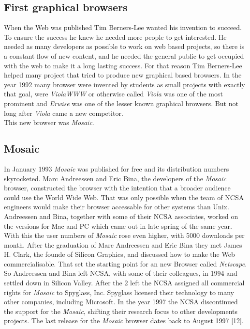 \documentclass[runningheads]{llncs}
\begin{document}
		\subsection{First graphical browsers}
		When the Web was published Tim Berners-Lee wanted his invention to succeed. To ensure the success he knew he needed more people to get interested. He needed as many developers as possible to work on web based projects, so there is a constant flow of new content, and he needed the general public to get occupied with the web to make it a long lasting success. For that reason Tim Berners-Lee helped many project that tried to produce new graphical based browsers. In the year 1992 many browser were invented by students as small projects with exactly that goal, were \textit{ViolaWWW} or otherwise called \textit{Viola} was one of the most prominent and \textit{Erwise} was one of the lesser known graphical browsers. But not long after \textit{Viola} came a new competitor. \\This new browser was \textit{Mosaic}.
		\subsection{Mosaic}
		In January 1993 \textit{Mosaic} was published for free and its distribution numbers skyrocketed. Marc Andreessen and Eric Bina, the developers of the \textit{Mosaic} browser, constructed the browser with the intention that a broader audience could use the World Wide Web. That was only possible when the team of NCSA engineers would make their browser accessable for other systems than Unix. Andreessen and Bina, together with some of their NCSA associates, worked on the versions for Mac and PC which came out in late spring of the same year. With this the user numbers of \textit{Mosaic} rose even higher, with 5000 downloads per month. After the graduation of Marc Andreessen and Eric Bina they met James H. Clark, the founde of Silicon Graphics, and discussed how to make the Web commercialisable. That set the starting point for an new Browser called \textit{Netscape}. So Andreessen and Bina left NCSA, with some of their colleagues, in 1994 and settled down in Silicon Valley. After the 2 left the NCSA assigned all commercial rights for \textit{Mosaic} to Spyglass, Inc. Spyglass licensed their technology to many other companies, including Microsoft. In the year 1997 the NCSA discontinued the support for the \textit{Mosaic}, shifting their research focus to other developments projects. The last release for the \textit{Mosaic} browser dates back to August 1997 [12].
\end{document}
